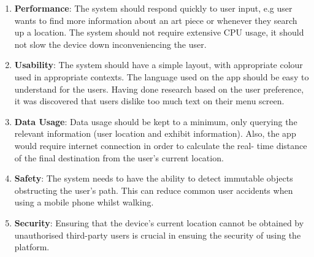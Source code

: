 \begin{enumerate}
	\item \textbf{Performance}: The system should respond quickly to user input, e.g user wants to find more information about an art piece or whenever they search up a location. The system should not require extensive CPU usage, it should not slow the device down inconveniencing the user.
	\item \textbf{Usability}: The system should have a simple layout, with appropriate colour used in appropriate contexts. The language used on the app should be easy to understand for the users. Having done research based on the user preference, it was discovered that users dislike too much text on their menu screen.
	\item \textbf{Data Usage}: Data usage should be kept to a minimum, only querying the relevant information (user location and exhibit information). Also, the app would require internet connection in order to calculate the real- time distance of the final destination from the user’s current location.
	\item \textbf{Safety}: The system needs to have the ability to detect immutable objects obstructing the user’s path. This can reduce common user accidents when using a mobile phone whilst walking.
	\item \textbf{Security}: Ensuring that the device’s current location cannot be obtained by unauthorised third-party users is crucial in ensuing the security of using the platform.
\end{enumerate}
